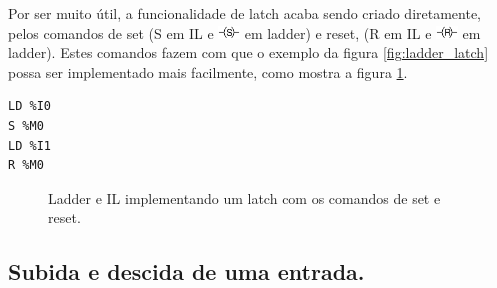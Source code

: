 Por ser muito útil, a funcionalidade de latch acaba sendo criado diretamente, pelos comandos de set (S em IL e \includegraphics[height=0.9em]{figuras/bobina_S} em ladder) e reset, (R em IL e \includegraphics[height=0.9em]{figuras/bobina_R} em ladder). Estes comandos fazem com que o exemplo da figura \ref{fig:ladder_latch} possa ser implementado mais facilmente, como mostra a figura \ref{fig:ladder_latchSR}.
\newsavebox\latchSRbox
\begin{lrbox}{\latchSRbox}
\begin{minipage}[b]{0.3\textwidth}
\begin{lstlisting}[]
LD %I0
S %M0
LD %I1
R %M0
\end{lstlisting}
\end{minipage}
\end{lrbox}


\begin{figure}[hbt]
	\centering
	\qquad\qquad
	\subfloat[t][IL]{\centering\usebox{\latchSRbox}
	}
	\caption{Ladder e IL implementando um latch com os comandos de set e reset.}
	\label{fig:ladder_latchSR}
\end{figure}

\subsection{Subida e descida de uma entrada.}


